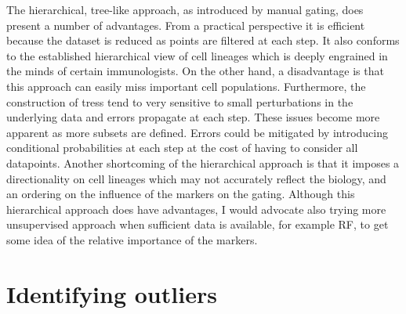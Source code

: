 The hierarchical, tree-like approach, as introduced by manual gating, does present a number of advantages.
From a practical perspective it is efficient because the dataset is reduced as points are filtered at each step.
It also conforms to the established hierarchical view of cell lineages which is deeply engrained in the minds of certain immunologists.
On the other hand, a disadvantage is that this approach can easily miss important cell populations.
Furthermore, the construction of tress tend to very sensitive to small perturbations in the underlying data and errors propagate at each step.
These issues become more apparent as more subsets are defined. 
Errors could be mitigated by introducing conditional probabilities at each step at the cost of having to consider all datapoints.
Another shortcoming of the hierarchical approach is that it imposes a directionality on cell lineages which may not accurately reflect the biology, and an ordering on the influence of the markers on the gating.
Although this hierarchical approach does have advantages, I would advocate also trying more unsupervised approach when sufficient data is available, for example \gls{RF}, to get some idea of the relative importance of the markers.


\section{ Identifying outliers }

